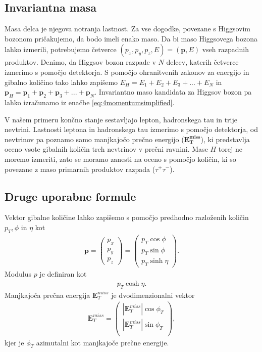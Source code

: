 \documentclass[11pt,a4paper,openany]{book}
\begin{document}
\subsection{Invariantna masa}
Masa delca je njegova notranja lastnost. Za vse dogodke, povezane s Higgsovim bozonom pričakujemo, da bodo imeli enako maso. Da bi maso Higgsovega bozona lahko izmerili, potrebujemo četverce $(p_x, p_y, p_z, E) = (\mathbf{p}, E)$ vseh razpadnih produktov. Denimo, da Higgsov bozon razpade v $N$ delcev, katerih četverce izmerimo s pomočjo detektorja. S pomočjo ohranitvenih zakonov za energijo in gibalno količino tako lahko zapišemo $E_H = E_1 + E_2 + E_3 + ... + E_N$ in $\mathbf{p}_H = \mathbf{p}_1 + \mathbf{p}_2 + \mathbf{p}_3 + ... + \mathbf{p}_N$. Invariantno maso kandidata za Higgsov bozon pa lahko izračunamo iz enačbe \ref{eq:4momentumsimplified}.

V našem primeru končno stanje sestavljajo lepton, hadronskega tau in trije nevtrini. Lastnosti leptona in hadronskega tau izmerimo s pomočjo detektorja, od nevtrinov pa poznamo samo manjkajočo prečno energijo ($\mathbf{E^{miss}_T}$), ki predstavlja oceno vsote gibalnih količin treh nevtrinov v prečni ravnini. Mase $H$ torej ne moremo izmeriti, zato se moramo zanesti na oceno s pomočjo količin, ki so povezane z maso primarnih produktov razpada ($\tau^+\tau^-$).

\subsection{Druge uporabne formule}

Vektor gibalne količine lahko zapišemo s pomočjo predhodno razloženih količin $p_T, \phi$ in $\eta$ kot
\begin{eqnarray}
	\mathbf{p} = \left( 
		\begin{array}{c}
			p_x \\
			p_y \\
			p_z 
		\end{array}
	\right) = \left(
		\begin{array}{c}
			p_T \cos \phi \\
			p_T \sin \phi \\
			p_T \sinh \eta
		\end{array}
	\right).
	\label{eq:momentum}
\end{eqnarray}
Modulus $p$ je definiran kot
\begin{eqnarray}
	p_T \cosh \eta.
	\label{eq:modulus}
\end{eqnarray}
Manjkajoča prečna energija $\mathbf{E}^{miss}_T$ je dvodimenzionalni vektor
\begin{eqnarray}
	\mathbf{E}^{miss}_T = \left(
		\begin{array}{c}
			|\mathbf{E}^{miss}_T| \cos \phi_T \\
			|\mathbf{E}^{miss}_T| \sin \phi_T \\
		\end{array}
	\right),
	\label{eq:emisst}
\end{eqnarray}
kjer je $\phi_T$ azimutalni kot manjkajoče prečne energije.
\end{document}

